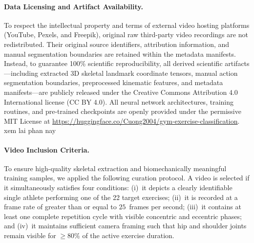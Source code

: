 \documentclass[preprint,12pt]{elsarticle}
\newcommand{\rv}[1]{{\color{red}#1}}
\begin{document}
\paragraph{Data Licensing and Artifact Availability.} To respect the intellectual property and terms of external video hosting platforms (YouTube, Pexels, and Freepik), original raw third-party video recordings are not redistributed. Their original source identifiers, attribution information, and manual segmentation boundaries are retained within the metadata manifests. Instead, to guarantee 100\% scientific reproducibility, all derived scientific artifacts---including extracted 3D skeletal landmark coordinate tensors, manual action segmentation boundaries, preprocessed kinematic features, and metadata manifests---are publicly released under the Creative Commons Attribution 4.0 International license (CC BY 4.0). All neural network architectures, training routines, and pre-trained checkpoints are openly provided under the permissive MIT License at \url{https://huggingface.co/Cuong2004/gym-exercise-classification}. \rv{xem lai phan nay}

\paragraph{Video Inclusion Criteria.}
To ensure high-quality skeletal extraction and biomechanically meaningful training samples, we applied the following curation protocol. A video is selected if it simultaneously satisfies four conditions: (i)~it depicts a clearly identifiable single athlete performing one of the 22 target exercises; (ii)~it is recorded at a frame rate of greater than or equal to $25$~frames per second; (iii)~it contains at least one complete repetition cycle with visible concentric and eccentric phases; and (iv)~it maintains sufficient camera framing such that hip and shoulder joints remain visible for $\ge 80\%$ of the active exercise duration.
\end{document}
